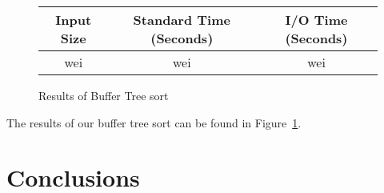 \documentclass{article}
\begin{document}
\begin{figure}
  \centering
  \begin{tabular}{|c|c|c|}
    \hline
    Input Size & Standard Time (Seconds) & I/O Time (Seconds)\\
    \hline
    \hline
    wei & wei & wei \\
    \hline
  \end{tabular}
  \caption{Results of Buffer Tree sort}
  \label{buffer-tree-res}
\end{figure}

The results of our buffer tree sort can be found in Figure~\ref{buffer-tree-res}.



\section{Conclusions}
\end{document}
